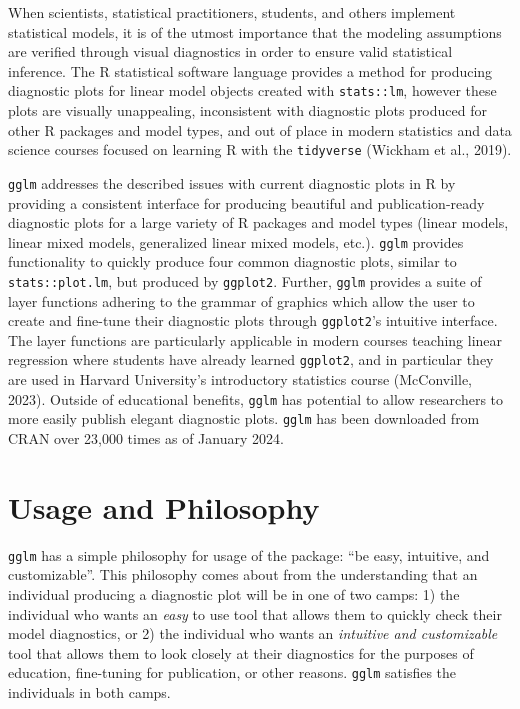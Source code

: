 \documentclass[10pt,a4paper,onecolumn]{article}
\begin{document}
When scientists, statistical practitioners, students, and others
implement statistical models, it is of the utmost importance that the
modeling assumptions are verified through visual diagnostics in order to
ensure valid statistical inference. The R statistical software language
provides a method for producing diagnostic plots for linear model
objects created with \texttt{stats::lm}, however these plots are
visually unappealing, inconsistent with diagnostic plots produced for
other R packages and model types, and out of place in modern statistics
and data science courses focused on learning R with the
\texttt{tidyverse} (Wickham et al., 2019).

\texttt{gglm} addresses the described issues with current diagnostic
plots in R by providing a consistent interface for producing beautiful
and publication-ready diagnostic plots for a large variety of R packages
and model types (linear models, linear mixed models, generalized linear
mixed models, etc.). \texttt{gglm} provides functionality to quickly
produce four common diagnostic plots, similar to
\texttt{stats::plot.lm}, but produced by \texttt{ggplot2}. Further,
\texttt{gglm} provides a suite of layer functions adhering to the
grammar of graphics which allow the user to create and fine-tune their
diagnostic plots through \texttt{ggplot2}'s intuitive interface. The
layer functions are particularly applicable in modern courses teaching
linear regression where students have already learned \texttt{ggplot2},
and in particular they are used in Harvard University's introductory
statistics course (McConville, 2023). Outside of educational benefits,
\texttt{gglm} has potential to allow researchers to more easily publish
elegant diagnostic plots. \texttt{gglm} has been downloaded from CRAN
over 23,000 times as of January 2024.

\hypertarget{usage-and-philosophy}{%
\section{Usage and Philosophy}\label{usage-and-philosophy}}

\texttt{gglm} has a simple philosophy for usage of the package: ``be
easy, intuitive, and customizable''. This philosophy comes about from
the understanding that an individual producing a diagnostic plot will be
in one of two camps: 1) the individual who wants an \emph{easy} to use
tool that allows them to quickly check their model diagnostics, or 2)
the individual who wants an \emph{intuitive and customizable} tool that
allows them to look closely at their diagnostics for the purposes of
education, fine-tuning for publication, or other reasons. \texttt{gglm}
satisfies the individuals in both camps.
\end{document}
